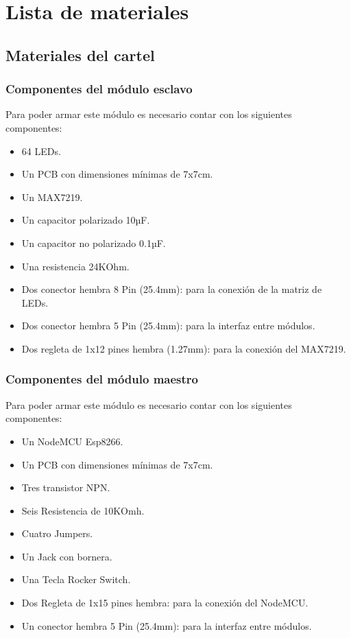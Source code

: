 \section{Lista de materiales}\label{sec:materiales}

\subsection{Materiales del cartel}

\subsubsection{Componentes del módulo esclavo}
Para poder armar este módulo es necesario contar con los siguientes componentes:
\begin{itemize}
    \item 64 LEDs.
    \item Un PCB con dimensiones mínimas de 7x7cm.
    \item Un MAX7219.
    \item Un capacitor polarizado 10µF.
    \item Un capacitor no polarizado 0.1µF.
    \item Una resistencia 24KOhm.
    \item Dos conector hembra 8 Pin (25.4mm): para la conexión de la matriz de LEDs.
    \item Dos conector hembra 5 Pin (25.4mm): para la interfaz entre módulos.
    \item Dos regleta de 1x12 pines hembra (1.27mm): para la conexión del MAX7219.
\end{itemize}    

\subsubsection{Componentes del módulo maestro}
Para poder armar este módulo es necesario contar con los siguientes componentes:
\begin{itemize}
    \item Un NodeMCU Esp8266.
    \item Un PCB con dimensiones mínimas de 7x7cm.
    \item Tres transistor NPN.
    \item Seis Resistencia de 10KOmh.
    \item Cuatro Jumpers.
    \item Un Jack con bornera.
    \item Una Tecla Rocker Switch.
    \item Dos Regleta de 1x15 pines hembra: para la conexión del NodeMCU.
    \item Un conector hembra 5 Pin (25.4mm): para la interfaz entre módulos.
\end{itemize}

